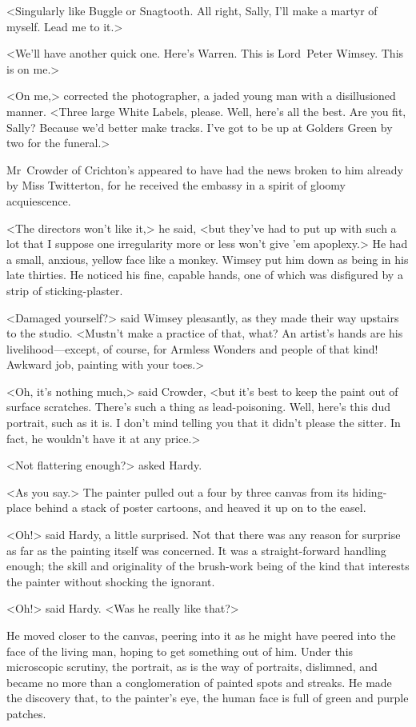 <Singularly like Buggle or Snagtooth. All right, Sally, I'll make a martyr of myself. Lead me to it.>

<We'll have another quick one. Here's Warren. This is Lord~Peter Wimsey. This is on me.>

<On me,> corrected the photographer, a jaded young man with a disillusioned manner. <Three large White Labels, please. Well, here's all the best. Are you fit, Sally? Because we'd better make tracks. I've got to be up at Golders Green by two for the funeral.>

Mr~Crowder of Crichton's appeared to have had the news broken to him already by Miss Twitterton, for he received the embassy in a spirit of gloomy acquiescence.

<The directors won't like it,> he said, <but they've had to put up with such a lot that I suppose one irregularity more or less won't give 'em apoplexy.> He had a small, anxious, yellow face like a monkey. Wimsey put him down as being in his late thirties. He noticed his fine, capable hands, one of which was disfigured by a strip of sticking-plaster.

<Damaged yourself?> said Wimsey pleasantly, as they made their way upstairs to the studio. <Mustn't make a practice of that, what? An artist's hands are his livelihood—except, of course, for Armless Wonders and people of that kind! Awkward job, painting with your toes.>

<Oh, it's nothing much,> said Crowder, <but it's best to keep the paint out of surface scratches. There's such a thing as lead-poisoning. Well, here's this dud portrait, such as it is. I don't mind telling you that it didn't please the sitter. In fact, he wouldn't have it at any price.>

<Not flattering enough?> asked Hardy.

<As you say.> The painter pulled out a four by three canvas from its hiding-place behind a stack of poster cartoons, and heaved it up on to the easel.

<Oh!> said Hardy, a little surprised. Not that there was any reason for surprise as far as the painting itself was concerned. It was a straight-forward handling enough; the skill and originality of the brush-work being of the kind that interests the painter without shocking the ignorant.

<Oh!> said Hardy. <Was he really like that?>

He moved closer to the canvas, peering into it as he might have peered into the face of the living man, hoping to get something out of him. Under this microscopic scrutiny, the portrait, as is the way of portraits, dislimned, and became no more than a conglomeration of painted spots and streaks. He made the discovery that, to the painter's eye, the human face is full of green and purple patches.

